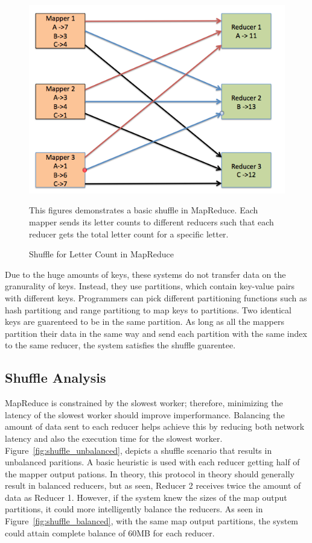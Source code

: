 \begin{figure}[h]
\begin{center}
\includegraphics[scale=0.6]{./img/shuffle_basic.png}
\caption{Shuffle for Letter Count in MapReduce}
\label{fig:shuffle_basic}
\end{center}
This figures demonstrates a basic shuffle in MapReduce. 
Each mapper sends its letter counts to different reducers such that each reducer
gets the total letter count for a specific letter.
\end{figure}
Due to the huge amounts of keys, these systems do not transfer data on the granurality of keys.
Instead, they use partitions, which contain key-value pairs with different keys. Programmers can pick different partitioning functions such as hash partitiong and range partitiong to map keys to partitions. Two identical keys are guarenteed to be in the same partition. As long as all the mappers partition their data in the same way and send each partition with the same index to the same reducer, the system satisfies 
the shuffle guarentee. 

\subsection {Shuffle Analysis}

MapReduce is constrained by the slowest worker; therefore, minimizing the latency of the slowest worker should improve imperformance.
Balancing the amount of data sent to each reducer helps achieve this by reducing both network latency and also the execution time for the slowest worker.
Figure~\ref{fig:shuffle_unbalanced}, depicts a shuffle scenario that results in unbalanced paritions. A basic heuristic is used with each reducer getting half of the mapper output pations. In theory, this protocol in theory should generally result in  balanced reducers, but as seen, Reducer 2 receives 
twice the amount of data as Reducer 1. However, if the system knew the sizes of the map output partitions,
it could more intelligently balance the reducers. As seen in Figure~\ref{fig:shuffle_balanced}, with the same map output partitions, the system could attain complete balance
of 60MB for each reducer.


